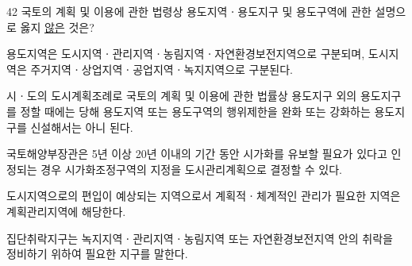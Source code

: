\begin{question}{42}
국토의 계획 및 이용에 관한 법령상 용도지역ㆍ용도지구 및 용도구역에 관한 설명으로 옳지 \uline{않은} 것은?
\begin{choices}
  \item 용도지역은 도시지역ㆍ관리지역ㆍ농림지역ㆍ자연환경보전지역으로 구분되며, 도시지역은 주거지역ㆍ상업지역ㆍ공업지역ㆍ녹지지역으로 구분된다.
  \item 시ㆍ도의 도시계획조례로 국토의 계획 및 이용에 관한 법률상 용도지구 외의 용도지구를 정할 때에는 당해 용도지역 또는 용도구역의 행위제한을 완화 또는 강화하는 용도지구를 신설해서는 아니 된다.
  \item 국토해양부장관은 5년 이상 20년 이내의 기간 동안 시가화를 유보할 필요가 있다고 인정되는 경우 시가화조정구역의 지정을 도시관리계획으로 결정할 수 있다.
  \item 도시지역으로의 편입이 예상되는 지역으로서 계획적ㆍ체계적인 관리가 필요한 지역은 계획관리지역에 해당한다.
  \item 집단취락지구는 녹지지역ㆍ관리지역ㆍ농림지역 또는 자연환경보전지역 안의 취락을 정비하기 위하여 필요한 지구를 말한다.
\end{choices}
\end{question}
